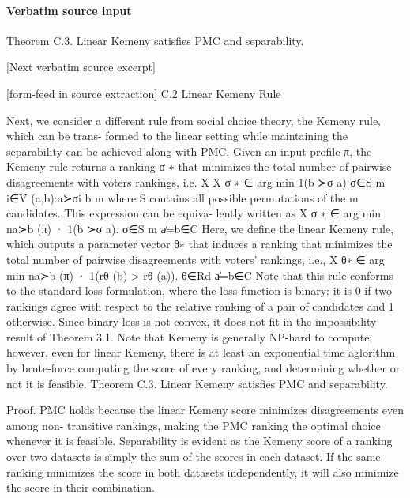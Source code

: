 \documentclass[10pt]{article}
\begin{document}
\paragraph{Verbatim source input}
\begin{ReviewVerbatim}
Theorem C.3. Linear Kemeny satisfies PMC and separability.

[Next verbatim source excerpt]


[form-feed in source extraction]
C.2   Linear Kemeny Rule

Next, we consider a different rule from social choice theory, the Kemeny rule, which can be trans-
formed to the linear setting while maintaining the separability can be achieved along with PMC.
Given an input profile π, the Kemeny rule returns a ranking σ ∗ that minimizes the total number of
pairwise disagreements with voters rankings, i.e.
                                            X X
                              σ ∗ ∈ arg min                1(b ≻σ a)
                                        σ∈S m
                                                 i∈V (a,b):a≻σi b
        m
where S contains all possible permutations of the m candidates. This expression can be equiva-
lently written as                        X
                          σ ∗ ∈ arg min        na≻b (π) · 1(b ≻σ a).
                                      σ∈S m
                                                a̸=b∈C
Here, we define the linear Kemeny rule, which outputs a parameter vector θ∗ that induces a ranking
that minimizes the total number of pairwise disagreements with voters’ rankings, i.e.,
                                        X
                          θ∗ ∈ arg min       na≻b (π) · 1(rθ (b) > rθ (a)).
                                 θ∈Rd    a̸=b∈C
Note that this rule conforms to the standard loss formulation, where the loss function is binary: it is
0 if two rankings agree with respect to the relative ranking of a pair of candidates and 1 otherwise.
Since binary loss is not convex, it does not fit in the impossibility result of Theorem 3.1.
Note that Kemeny is generally NP-hard to compute; however, even for linear Kemeny, there is
at least an exponential time aglorithm by brute-force computing the score of every ranking, and
determining whether or not it is feasible.
Theorem C.3. Linear Kemeny satisfies PMC and separability.

Proof. PMC holds because the linear Kemeny score minimizes disagreements even among non-
transitive rankings, making the PMC ranking the optimal choice whenever it is feasible. Separability
is evident as the Kemeny score of a ranking over two datasets is simply the sum of the scores in each
dataset. If the same ranking minimizes the score in both datasets independently, it will also minimize
the score in their combination.
\end{ReviewVerbatim}
\end{document}
